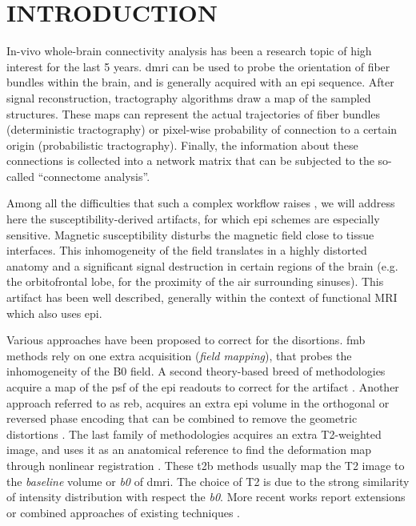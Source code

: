 \section{INTRODUCTION}
\label{sec:intro}
In-vivo whole-brain connectivity analysis has been a
research topic of high interest for the last
5 years. 
\Gls*{dmri} can be used to probe the
orientation of fiber bundles within the brain,
and is generally acquired with an \gls*{epi} sequence.
After signal reconstruction,
tractography algorithms draw a map of the sampled 
structures.
These maps can represent the actual trajectories
of fiber bundles (deterministic tractography) or
pixel-wise probability of connection to a certain origin
(probabilistic tractography). Finally, the
information about these connections is collected
into a network matrix that can be subjected to
the so-called ``connectome analysis''.

Among all the difficulties that such a complex workflow
raises \cite{jones_twenty-five_2010}, we will
address here the susceptibility-derived artifacts,
for which \Gls*{epi} schemes are especially sensitive.
Magnetic susceptibility disturbs the magnetic field
close to tissue interfaces. This inhomogeneity
of the field translates in a highly distorted
anatomy and a significant signal destruction in
certain regions of the brain 
(e.g. the orbitofrontal lobe, for the proximity of the
air surrounding sinuses). This artifact has been
well described, generally within the context of
functional MRI which also uses \gls*{epi}.

Various approaches have been proposed to correct
for the disortions. \Gls*{fmb} methods
\cite{jezzard_correction_1995} rely on one extra
acquisition (\emph{field mapping}),
that probes the inhomogeneity of the B0 field.
A second theory-based breed of methodologies acquire a 
map of the \acrlong*{psf} of the \gls*{epi} readouts to correct 
for the artifact \cite{robson_measurement_1997}.
Another approach referred to as \gls*{reb}, acquires an
extra \gls*{epi} volume in the orthogonal or reversed
phase encoding that can be combined to remove the
geometric distortions
\cite{cordes_geometric_2000,chiou_simple_2000}.
The last family of methodologies acquires an
extra T2-weighted image, and uses it as an anatomical
reference to find the deformation map through nonlinear 
registration \cite{kybic_unwarping_2000,studholme_accurate_2000}.
These \gls*{t2b} methods usually map
the T2 image to the \emph{baseline} volume or \textit{b0}
of \gls*{dmri}. The choice of T2 is due to the strong
similarity of intensity distribution with respect the \textit{b0}.
More recent works report extensions or combined
approaches of existing techniques
\cite{andersson_how_2003,zaitsev_point_2004,%
holland_efficient_2010,andersson_comprehensive_2012}.

